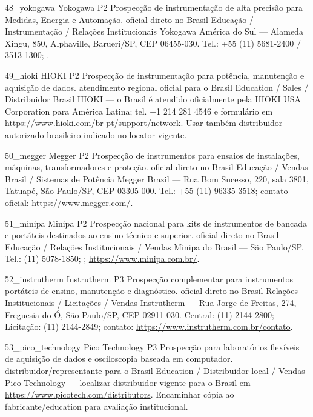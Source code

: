 \ContatoEmpresa
  {48_yokogawa}
  {Yokogawa}
  {P2}
  {Prospecção de instrumentação de alta precisão para Medidas, Energia e Automação.}
  {oficial direto no Brasil}
  {Educação / Instrumentação / Relações Institucionais}
  {Yokogawa América do Sul — Alameda Xingu, 850, Alphaville, Barueri/SP, CEP 06455-030. Tel.: +55 (11) 5681-2400 / 3513-1300; .}

\ContatoEmpresa
  {49_hioki}
  {HIOKI}
  {P2}
  {Prospecção de instrumentação para potência, manutenção e aquisição de dados.}
  {atendimento regional oficial para o Brasil}
  {Education / Sales / Distribuidor Brasil}
  {HIOKI — o Brasil é atendido oficialmente pela HIOKI USA Corporation para América Latina; tel. +1 214 281 4546 e formulário em \url{https://www.hioki.com/br-pt/support/network}. Usar também distribuidor autorizado brasileiro indicado no locator vigente.}

\ContatoEmpresa
  {50_megger}
  {Megger}
  {P2}
  {Prospecção de instrumentos para ensaios de instalações, máquinas, transformadores e proteção.}
  {oficial direto no Brasil}
  {Educação / Vendas Brasil / Sistemas de Potência}
  {Megger Brazil — Rua Bom Sucesso, 220, sala 3801, Tatuapé, São Paulo/SP, CEP 03305-000. Tel.: +55 (11) 96335-3518; contato oficial: \url{https://www.megger.com/}.}

\ContatoEmpresa
  {51_minipa}
  {Minipa}
  {P2}
  {Prospecção nacional para kits de instrumentos de bancada e portáteis destinados ao ensino técnico e superior.}
  {oficial direto no Brasil}
  {Educação / Relações Institucionais / Vendas}
  {Minipa do Brasil — São Paulo/SP. Tel.: (11) 5078-1850; ; \url{https://www.minipa.com.br/}.}

\ContatoEmpresa
  {52_instrutherm}
  {Instrutherm}
  {P3}
  {Prospecção complementar para instrumentos portáteis de ensino, manutenção e diagnóstico.}
  {oficial direto no Brasil}
  {Relações Institucionais / Licitações / Vendas}
  {Instrutherm — Rua Jorge de Freitas, 274, Freguesia do Ó, São Paulo/SP, CEP 02911-030. Central: (11) 2144-2800; Licitação: (11) 2144-2849; contato: \url{https://www.instrutherm.com.br/contato}.}

\ContatoEmpresa
  {53_pico_technology}
  {Pico Technology}
  {P3}
  {Prospecção para laboratórios flexíveis de aquisição de dados e osciloscopia baseada em computador.}
  {distribuidor/representante para o Brasil}
  {Education / Distribuidor local / Vendas}
  {Pico Technology — localizar distribuidor vigente para o Brasil em \url{https://www.picotech.com/distributors}. Encaminhar cópia ao fabricante/education para avaliação institucional.}

